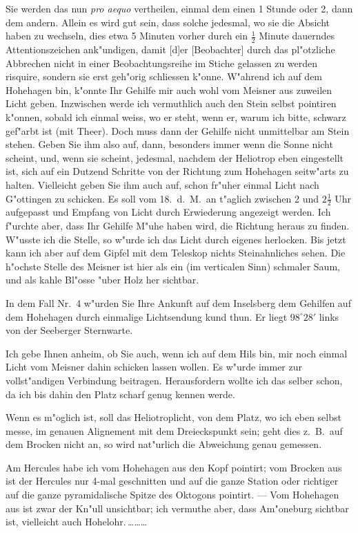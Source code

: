 \documentclass[12pt,a4paper]{article}
\theoremstyle{plain}
\theoremstyle{definition}
\theoremstyle{remark}
\begin{document}
Sie werden das nun \emph{pro aequo} vertheilen, einmal dem einen 1 Stunde oder 2, dann dem andern. Allein es wird gut sein, dass solche jedesmal, wo sie die Absicht haben zu wechseln, dies etwa 5 Minuten vorher durch ein $\frac{1}{2}$ Minute dauerndes Attentionszeichen ank"undigen, damit [d]er [Beobachter] durch das pl"otzliche Abbrechen nicht in einer Beobachtungsreihe im Stiche gelassen zu werden risquire, sondern sie erst geh"orig schliessen k"onne. W"ahrend ich auf dem Hohehagen bin, k"onnte Ihr Gehilfe mir auch wohl vom Meisner aus zuweilen Licht geben. Inzwischen werde ich vermuthlich auch den Stein selbst pointiren k"onnen, sobald ich einmal weiss, wo er steht, wenn er, warum ich bitte, schwarz gef"arbt ist (mit Theer). Doch muss dann der Gehilfe nicht unmittelbar am Stein stehen. Geben Sie ihm also auf, dann, besonders immer wenn die Sonne nicht scheint, und, wenn sie scheint, jedesmal, nachdem der Heliotrop eben eingestellt ist, sich auf ein Dutzend Schritte von der Richtung zum Hohehagen seitw"arts zu halten. Vielleicht geben Sie ihm auch auf, schon fr"uher einmal Licht nach G"ottingen zu schicken. Es soll vom 18.\ d.\ M.\ an t"aglich zwischen 2 und $2\frac{1}{2}$ Uhr aufgepasst und Empfang von Licht durch Erwiederung angezeigt werden. Ich f"urchte aber, dass Ihr Gehilfe M"uhe haben wird, die Richtung heraus zu finden. W"usste ich die Stelle, so w"urde ich das Licht durch eigenes herlocken. Bis jetzt kann ich aber auf dem Gipfel mit dem Teleskop nichts Steinahnliches sehen. Die h"ochste Stelle des Meisner ist hier als ein (im verticalen Sinn) schmaler Saum, und als kahle Bl"osse "uber Holz her sichtbar.

\newpage
\noindent In dem Fall Nr.~4 w"urden Sie Ihre Ankunft auf dem Inselsberg dem Gehilfen auf dem Hohehagen durch einmalige Lichtsendung kund thun. Er liegt $98^{\circ}28'$ links von der Seeberger Sternwarte.

Ich gebe Ihnen anheim, ob Sie auch, wenn ich auf dem Hils bin, mir noch einmal Licht vom Meisner dahin schicken lassen wollen. Es w"urde immer zur vollst"andigen Verbindung beitragen. Herausfordern wollte ich das selber schon, da ich bis dahin den Platz scharf genug kennen werde.

Wenn es m"oglich ist, soll das Heliotroplicht, von dem Platz, wo ich eben selbst messe, im genauen Alignement mit dem Dreieckspunkt sein; geht dies z.~B.\ auf dem Brocken nicht an, so wird nat"urlich die Abweichung genau gemessen.

Am Hercules habe ich vom Hohehagen aus den Kopf pointirt; vom Brocken aus ist der Hercules nur 4-mal geschnitten und auf die ganze Station oder richtiger auf die ganze pyramidalische Spitze des Oktogons pointirt. --- Vom Hohehagen aus ist zwar der Kn"ull unsichtbar; ich vermuthe aber, dass Am"oneburg sichtbar ist, vielleicht auch Hohelohr.\,\ldots\ldots\ldots
\end{document}
